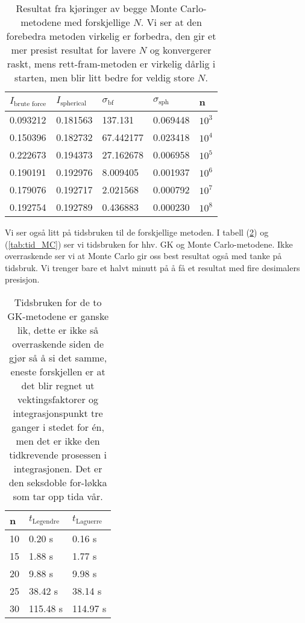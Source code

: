 \documentclass[norsk, 10pt,twocolumn]{article}
\begin{document}
\begin{table}[H]
  \centering
  \begin{tabular}{ l l l l l}
    \toprule
    $I_{\text{brute force}}$ & $I_{\text{spherical}}$ & $\sigma_{\text{bf}}$ & $\sigma_{\text{sph}}$ & n \\
    \midrule
	0.093212 & 0.181563 & 137.131 & 0.069448 & $10^3$ \\
	0.150396 & 0.182732 & 67.442177 & 0.023418 & $10^4$ \\
	0.222673 & 0.194373 & 27.162678 & 0.006958 & $10^5$ \\
	0.190191 & 0.192976 & 8.009405 & 0.001937 & $10^6$ \\
	0.179076 & 0.192717 & 2.021568 & 0.000792 & $10^7$ \\
	0.192754 & 0.192789 & 0.436883 & 0.000230 & $10^8$ \\
	\bottomrule
  \end{tabular}
  \caption{Resultat fra kjøringer av begge Monte Carlo-metodene med forskjellige $N$. Vi ser at den forebedra metoden virkelig er forbedra, den gir et mer presist resultat for lavere $N$ og konvergerer raskt, mens rett-fram-metoden er virkelig dårlig i starten, men blir litt bedre for veldig store $N$.}
  \label{tab:MC}
\end{table}
Vi ser også litt på tidsbruken til de forskjellige metoden. I tabell (\ref{tab:tid_gk}) og (\ref{tab:tid_MC}) ser vi tidsbruken for hhv. GK og Monte Carlo-metodene. Ikke overraskende ser vi at Monte Carlo gir oss best resultat også med tanke på tidsbruk. Vi trenger bare et halvt minutt på å få et resultat med fire desimalers presisjon.
\begin{table}[H]
  \centering
  \begin{tabular}{ l l l}
    \toprule
	n & $t_{\text{Legendre}}$ & $t_{\text{Laguerre}}$ \\
	\midrule
	10 & 0.20 s & 0.16 s \\
	15 & 1.88 s & 1.77 s \\
	20 & 9.88 s & 9.98 s \\
	25 & 38.42 s & 38.14 s \\
	30 & 115.48 s & 114.97 s\\
	\bottomrule
  \end{tabular}
  \caption{Tidsbruken for de to GK-metodene er ganske lik, dette er ikke så overraskende siden de gjør så å si det samme, eneste forskjellen er at det blir regnet ut vektingsfaktorer og integrasjonspunkt tre ganger i stedet for én, men det er ikke den tidkrevende prosessen i integrasjonen. Det er den seksdoble for-løkka som tar opp tida vår.}
  \label{tab:tid_gk}
\end{table}
\end{document}
